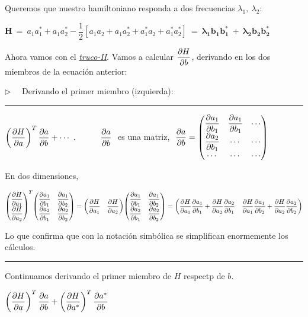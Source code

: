 Queremos que nuestro hamiltoniano responda a dos frecuencias $\lambda_1,\ \lambda_2$:

$\boldsymbol H\ =\ a_1a_1^*+a_1a_2^*-\dfrac 1 2 [a_1a_2+a_1a_2^*+a_1^*a_2+a_1^*a_2^*] \ = \ \boldsymbol {\lambda_1 b_1b_1^* \ + \ \lambda_2 b_2b_2^*}$

Ahora vamos con el \underline{\emph{truco-II}}. Vamos a calcular $\displaystyle \pdv{H}{b}$, derivando en los dos miembros de la ecuación anterior:

$\triangleright \quad$ Derivando el primer miembro (izquierda):



\rule{200pt}{0.1pt}
\begin{small}
\color{gris}
\vspace{-5mm}

$\displaystyle  \left(\pdv{H}{a}\right)^T \pdv{a}{b} + \cdots \ . \qquad \quad \pdv{a}{b} \  $ es una matriz, $\displaystyle \ \pdv{a}{b} = \mqty(\displaystyle \pdv{a_1}{b_1} &  \displaystyle  \pdv{a_1}{b_1} & \cdots \\ \displaystyle  \pdv{a_2}{b_1}  & \cdots & \cdots \\ \cdots & \cdots & \cdots )$ 

En dos dimensiones,

$\mqty(\displaystyle \pdv{H}{a_1} \\ \displaystyle \pdv{H}{a_2})^T \mqty( \displaystyle \pdv{a_1}{b_1} & \displaystyle \pdv{a_1}{b_2} \\ \displaystyle \pdv{a_2}{b_1} & \displaystyle \pdv{a_2}{b_2})=
\mqty(\displaystyle \pdv{H}{a_1} & \displaystyle \pdv{H}{a_2}) \mqty( \displaystyle \pdv{a_1}{b_1} & \displaystyle \pdv{a_1}{b_2} \\ \displaystyle \pdv{a_2}{b_1} & \displaystyle \pdv{a_2}{b_2})=
\mqty( \displaystyle \pdv{H}{a_1}\pdv{a_1}{b_1} + \displaystyle \pdv{H}{a_2}\pdv{a_2}{b_1}  & \displaystyle \pdv{H}{a_1}\pdv{a_1}{b_2} + \displaystyle \pdv{H}{a_2}\pdv{a_2}{b_2} )$

Lo que confirma que con la notación simbólica se simplifican enormemente los cálculos.
\end{small}

\vspace{-10mm}
\begin{flushright}
\rule{200pt}{0.1pt}	
 \end{flushright}

Continuamos derivando el primer miembro de $H$ respectp de $b$.

$\displaystyle \left( \pdv{H}{a} \right)^T \pdv{a}{b} + \left( \pdv{H}{a^*} \right)^T \pdv{a^*}{b}$

